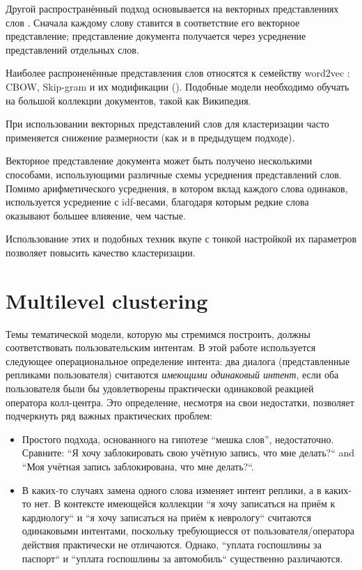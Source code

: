 \par Другой распространённый подход основывается на векторных представлениях слов \cite{embeddings_in_tm}. Сначала каждому слову ставится в соответствие его векторное представление; представление документа получается через усреднение представлений отдельных слов.

Наиболее распроненённые представления слов относятся к семейству word2vec \cite{word2vec}: CBOW, Skip-gram и их модификации (\cite{mikolov2013efficient}). 
Подобные модели необходимо обучать на большой коллекции документов, такой как Википедия.

При использовании векторных представлений слов для кластеризации часто применяется снижение размерности \cite{park2019adc} (как и в предыдущем подходе).

Векторное представление документа может быть получено несколькими способами, использующими различные схемы усреднения представлений слов. Помимо арифметического усреднения, в котором вклад каждого слова одинаков, используется усреднение с idf-весами, благодаря которым редкие слова оказывают большее влияение, чем частые.

Использование этих и подобных техник вкупе с тонкой настройкой их параметров позволяет повысить качество кластеризации.


\section{Multilevel clustering} \label{multilevel}     

\par Темы тематической модели, которую мы стремимся построить, должны соответствовать пользовательским интентам. В этой работе используется следующее операциональное определение интента:
два диалога (представленные репликами пользователя) считаются \textit{имеющими одинаковый интент}, если оба пользователя были бы удовлетворены практически одинаковой реакцией оператора колл-центра. Это определение, несмотря на свои недостатки, позволяет подчеркнуть ряд важных практических проблем:

\begin{itemize}
\item Простого подхода, основанного на гипотезе ``мешка слов'', недостаточно. Сравните: ``Я хочу заблокировать свою учётную запись, что мне делать?`` and ``Моя учётная запись заблокирована, что мне делать?``.

\item В каких-то случаях замена одного слова изменяет интент реплики, а в каких-то нет. В контексте имеющейся коллекции ``я хочу записаться на приём к кардиологу`` и ``я хочу записаться на приём к неврологу`` считаются одинаковыми интентами, поскольку требующиесся от пользователя/оператора действия практически не отличаются. Однако, ``уплата госпошлины за паспорт`` и ``уплата госпошлины за автомобиль`` существенно различаются.

\end{itemize}

